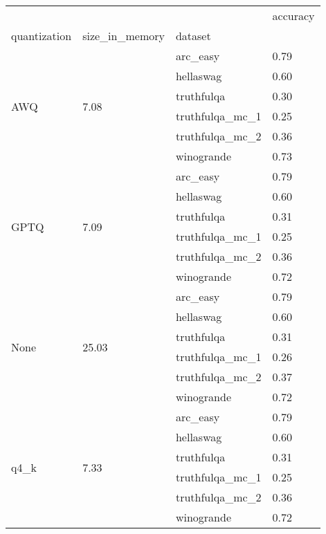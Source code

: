 \begin{tabular}{llll}
\toprule
 &  &  & accuracy \\
quantization & size\_in\_memory & dataset &  \\
\midrule
\multirow[t]{6}{*}{AWQ} & \multirow[t]{6}{*}{7.08} & arc\_easy & 0.79 \\
 &  & hellaswag & 0.60 \\
 &  & truthfulqa & 0.30 \\
 &  & truthfulqa\_mc\_1 & 0.25 \\
 &  & truthfulqa\_mc\_2 & 0.36 \\
 &  & winogrande & 0.73 \\
\cline{1-4} \cline{2-4}
\multirow[t]{6}{*}{GPTQ} & \multirow[t]{6}{*}{7.09} & arc\_easy & 0.79 \\
 &  & hellaswag & 0.60 \\
 &  & truthfulqa & 0.31 \\
 &  & truthfulqa\_mc\_1 & 0.25 \\
 &  & truthfulqa\_mc\_2 & 0.36 \\
 &  & winogrande & 0.72 \\
\cline{1-4} \cline{2-4}
\multirow[t]{6}{*}{None} & \multirow[t]{6}{*}{25.03} & arc\_easy & 0.79 \\
 &  & hellaswag & 0.60 \\
 &  & truthfulqa & 0.31 \\
 &  & truthfulqa\_mc\_1 & 0.26 \\
 &  & truthfulqa\_mc\_2 & 0.37 \\
 &  & winogrande & 0.72 \\
\cline{1-4} \cline{2-4}
\multirow[t]{6}{*}{q4\_k} & \multirow[t]{6}{*}{7.33} & arc\_easy & 0.79 \\
 &  & hellaswag & 0.60 \\
 &  & truthfulqa & 0.31 \\
 &  & truthfulqa\_mc\_1 & 0.25 \\
 &  & truthfulqa\_mc\_2 & 0.36 \\
 &  & winogrande & 0.72 \\
\cline{1-4} \cline{2-4}
\bottomrule
\end{tabular}
